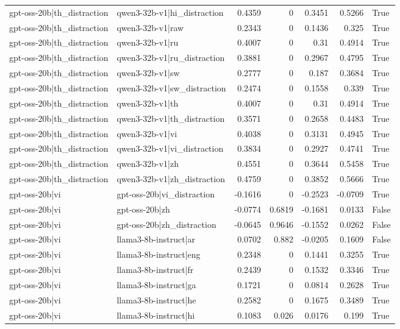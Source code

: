 \begin{table}
\begin{tabular}{l l r r r r l}
gpt-oss-20b|th_distraction & qwen3-32b-v1|hi_distraction & 0.4359 & 0 & 0.3451 & 0.5266 & True \\
gpt-oss-20b|th_distraction & qwen3-32b-v1|raw & 0.2343 & 0 & 0.1436 & 0.325 & True \\
gpt-oss-20b|th_distraction & qwen3-32b-v1|ru & 0.4007 & 0 & 0.31 & 0.4914 & True \\
gpt-oss-20b|th_distraction & qwen3-32b-v1|ru_distraction & 0.3881 & 0 & 0.2967 & 0.4795 & True \\
gpt-oss-20b|th_distraction & qwen3-32b-v1|sw & 0.2777 & 0 & 0.187 & 0.3684 & True \\
gpt-oss-20b|th_distraction & qwen3-32b-v1|sw_distraction & 0.2474 & 0 & 0.1558 & 0.339 & True \\
gpt-oss-20b|th_distraction & qwen3-32b-v1|th & 0.4007 & 0 & 0.31 & 0.4914 & True \\
gpt-oss-20b|th_distraction & qwen3-32b-v1|th_distraction & 0.3571 & 0 & 0.2658 & 0.4483 & True \\
gpt-oss-20b|th_distraction & qwen3-32b-v1|vi & 0.4038 & 0 & 0.3131 & 0.4945 & True \\
gpt-oss-20b|th_distraction & qwen3-32b-v1|vi_distraction & 0.3834 & 0 & 0.2927 & 0.4741 & True \\
gpt-oss-20b|th_distraction & qwen3-32b-v1|zh & 0.4551 & 0 & 0.3644 & 0.5458 & True \\
gpt-oss-20b|th_distraction & qwen3-32b-v1|zh_distraction & 0.4759 & 0 & 0.3852 & 0.5666 & True \\
gpt-oss-20b|vi & gpt-oss-20b|vi_distraction & -0.1616 & 0 & -0.2523 & -0.0709 & True \\
gpt-oss-20b|vi & gpt-oss-20b|zh & -0.0774 & 0.6819 & -0.1681 & 0.0133 & False \\
gpt-oss-20b|vi & gpt-oss-20b|zh_distraction & -0.0645 & 0.9646 & -0.1552 & 0.0262 & False \\
gpt-oss-20b|vi & llama3-8b-instruct|ar & 0.0702 & 0.882 & -0.0205 & 0.1609 & False \\
gpt-oss-20b|vi & llama3-8b-instruct|eng & 0.2348 & 0 & 0.1441 & 0.3255 & True \\
gpt-oss-20b|vi & llama3-8b-instruct|fr & 0.2439 & 0 & 0.1532 & 0.3346 & True \\
gpt-oss-20b|vi & llama3-8b-instruct|ga & 0.1721 & 0 & 0.0814 & 0.2628 & True \\
gpt-oss-20b|vi & llama3-8b-instruct|he & 0.2582 & 0 & 0.1675 & 0.3489 & True \\
gpt-oss-20b|vi & llama3-8b-instruct|hi & 0.1083 & 0.026 & 0.0176 & 0.199 & True \\

\end{tabular}
\end{table}
